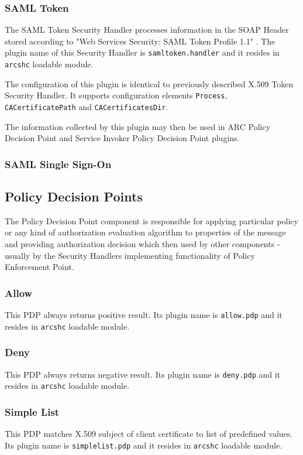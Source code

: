 \documentclass{article}
\begin{document}
\subsubsection{SAML Token}
The SAML Token Security Handler processes information in the SOAP Header
stored according to "Web Services Security: SAML Token Profile 1.1"
\cite{ws-security-samltoken}. The plugin name of this Security Handler
is \texttt{samltoken.handler} and it resides in \texttt{arcshc} loadable
module.

The configuration of this plugin is identical to previously described
X.509 Token Security Handler. It supports configuration elements
\texttt{Process}, \texttt{CACertificatePath} and \texttt{CACertificatesDir}.

The information collected by this plugin may then be used in ARC Policy
Decision Point and Service Invoker Policy Decision Point plugins.

\subsubsection{SAML Single Sign-On}

\subsection{Policy Decision Points}\label{sec:Policy Decision Points}
The Policy Decision Point component is responsible for applying particular
policy or any kind of authorization evaluation algorithm to properties
of the message and providing authorization decision which then used by
other components - usually by the Security Handlers implementing
functionality of Policy Enforcement Point.

\subsubsection{Allow}
This PDP always returns positive result. Its plugin name is \texttt{allow.pdp}
and it resides in \texttt{arcshc} loadable module.

\subsubsection{Deny}
This PDP always returns negative result. Its plugin name is \texttt{deny.pdp}
and it resides in \texttt{arcshc} loadable module.

\subsubsection{Simple List}
This PDP matches X.509 subject of client certificate to list of predefined values.
Its plugin name is \texttt{simplelist.pdp} and it resides in \texttt{arcshc} loadable
module.
\end{document}
